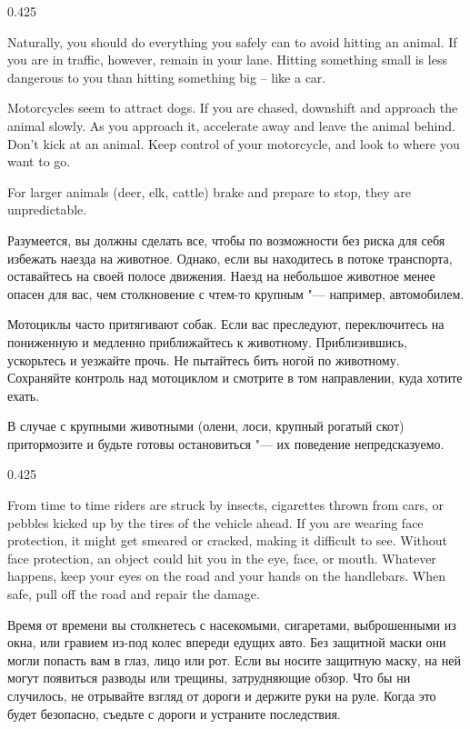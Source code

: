 \begin{langblock}{0.425}
	\begin{eng}
	
	Naturally, you should do everything you safely can to avoid hitting an animal. If you are in traffic, however, remain in your lane. Hitting something small is less dangerous to you than hitting something big -- like a car.
	
	Motorcycles seem to attract dogs. If you are chased, downshift and approach the animal slowly. As you approach it, accelerate away and leave the animal behind. Don't kick at an animal. Keep control of your motorcycle, and look to where you want to go.
	
	For larger animals (deer, elk, cattle) brake and prepare to stop, they are unpredictable.
	\end{eng}
	\begin{rus}
		
		Разумеется, вы должны сделать все, чтобы по возможности без риска для себя избежать наезда на животное. Однако, если вы находитесь в потоке транспорта, оставайтесь на своей полосе движения. Наезд на небольшое животное менее опасен для вас, чем столкновение с чтем-то крупным "--- например, автомобилем.
		
		Мотоциклы часто притягивают собак. Если вас преследуют, переключитесь на пониженную и медленно приближайтесь к животному. Приблизившись, ускорьтесь и уезжайте прочь. Не пытайтесь бить ногой по животному. Сохраняйте контроль над мотоциклом и смотрите в том направлении, куда хотите ехать.
		
		В случае с крупными животными (олени, лоси, крупный рогатый скот) притормозите и будьте готовы остановиться "--- их поведение непредсказуемо.
\end{rus}
\end{langblock}



\begin{langblock}{0.425}
	\begin{eng}
	
	From time to time riders are struck by insects, cigarettes thrown from cars, or pebbles kicked up by the tires of the vehicle ahead. If you are wearing face protection, it might get smeared or cracked, making it difficult to see. Without face protection, an object could hit you in the eye, face, or mouth. Whatever happens, keep your eyes on the road and your hands on the handlebars. When safe, pull off the road and repair the damage.
	\end{eng}
	\begin{rus}
		
		Время от времени вы столкнетесь с насекомыми, сигаретами, выброшенными из окна, или гравием из-под колес впереди едущих авто. Без защитной маски они могли попасть вам в глаз, лицо или рот. Если вы носите защитную маску, на ней могут появиться разводы или трещины, затрудняющие обзор. Что бы ни случилось, не отрывайте взгляд от дороги и держите руки на руле. Когда это будет безопасно, съедьте с дороги и устраните последствия.
\end{rus}
\end{langblock}


